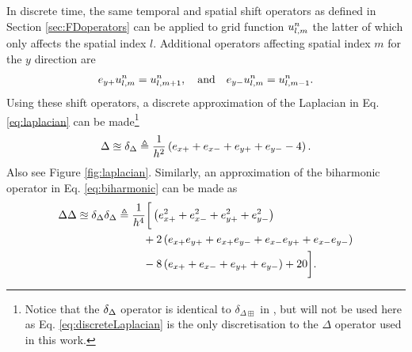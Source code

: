 In discrete time, the same temporal and spatial shift operators as defined in Section \ref{sec:FDoperators} can be applied to grid function $u_{l,m}^n$ the latter of which only affects the spatial index $l$. Additional operators affecting spatial index $m$ for the $y$ direction are
\begin{equation}
    e_{y+}u_{l,m}^n = u_{l, m+1}^n,\quad \text{and}\quad e_{y-}u_{l,m}^n= u_{l, m-1}^n.
\end{equation}
Using these shift operators, a discrete approximation of the Laplacian in Eq. \eqref{eq:laplacian} can be made\footnote{Notice that the $\delta_{\Delta}$ operator is identical to $\delta_{\Delta \boxplus}$ in \cite{theBible}, but will not be used here as Eq. \eqref{eq:discreteLaplacian} is the only discretisation to the $\Delta$ operator used in this work.} 
\begin{equation}\label{eq:discreteLaplacian}
    \Delta \approxeq \delta_{\Delta} \triangleq \frac{1}{h^2}\left(e_{x+} + e_{x-} + e_{y+} + e_{y-} - 4\right).
\end{equation}
Also see Figure \ref{fig:laplacian}. Similarly, an approximation of the biharmonic operator in Eq. \eqref{eq:biharmonic} can be made as
\begin{equation}\label{eq:discreteBiharmonic}
        \Delta\Delta \approxeq \delta_{\Delta}\delta_{\Delta} 
        \triangleq \begin{aligned}[t]
        &\frac{1}{h^4}\bigg[\left(e_{x+}^2 + e_{x-}^2 + e_{y+}^2 + e_{y-}^2\right) \\
        &\ \ \ + 2 \left(e_{x+}e_{y+} + e_{x+}e_{y-} + e_{x-}e_{y+} + e_{x-}e_{y-}\right) \\
        &\ \ \ -8 \left(e_{x+} + e_{x-} + e_{y+} + e_{y-}\right) + 20\bigg].
    \end{aligned}
\end{equation}
